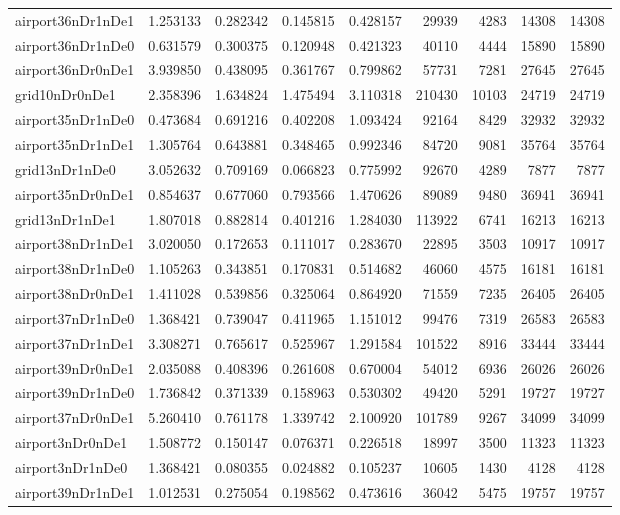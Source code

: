\begin{longtable}{|l|r|r|r|r|r|r|r|r|}
airport36nDr1nDe1 & 1.253133 & 0.282342 & 0.145815 & 0.428157 & 29939 & 4283 & 14308 & 14308 \\
airport36nDr1nDe0 & 0.631579 & 0.300375 & 0.120948 & 0.421323 & 40110 & 4444 & 15890 & 15890 \\
airport36nDr0nDe1 & 3.939850 & 0.438095 & 0.361767 & 0.799862 & 57731 & 7281 & 27645 & 27645 \\
grid10nDr0nDe1 & 2.358396 & 1.634824 & 1.475494 & 3.110318 & 210430 & 10103 & 24719 & 24719 \\
airport35nDr1nDe0 & 0.473684 & 0.691216 & 0.402208 & 1.093424 & 92164 & 8429 & 32932 & 32932 \\
airport35nDr1nDe1 & 1.305764 & 0.643881 & 0.348465 & 0.992346 & 84720 & 9081 & 35764 & 35764 \\
grid13nDr1nDe0 & 3.052632 & 0.709169 & 0.066823 & 0.775992 & 92670 & 4289 & 7877 & 7877 \\
airport35nDr0nDe1 & 0.854637 & 0.677060 & 0.793566 & 1.470626 & 89089 & 9480 & 36941 & 36941 \\
grid13nDr1nDe1 & 1.807018 & 0.882814 & 0.401216 & 1.284030 & 113922 & 6741 & 16213 & 16213 \\
airport38nDr1nDe1 & 3.020050 & 0.172653 & 0.111017 & 0.283670 & 22895 & 3503 & 10917 & 10917 \\
airport38nDr1nDe0 & 1.105263 & 0.343851 & 0.170831 & 0.514682 & 46060 & 4575 & 16181 & 16181 \\
airport38nDr0nDe1 & 1.411028 & 0.539856 & 0.325064 & 0.864920 & 71559 & 7235 & 26405 & 26405 \\
airport37nDr1nDe0 & 1.368421 & 0.739047 & 0.411965 & 1.151012 & 99476 & 7319 & 26583 & 26583 \\
airport37nDr1nDe1 & 3.308271 & 0.765617 & 0.525967 & 1.291584 & 101522 & 8916 & 33444 & 33444 \\
airport39nDr0nDe1 & 2.035088 & 0.408396 & 0.261608 & 0.670004 & 54012 & 6936 & 26026 & 26026 \\
airport39nDr1nDe0 & 1.736842 & 0.371339 & 0.158963 & 0.530302 & 49420 & 5291 & 19727 & 19727 \\
airport37nDr0nDe1 & 5.260410 & 0.761178 & 1.339742 & 2.100920 & 101789 & 9267 & 34099 & 34099 \\
airport3nDr0nDe1 & 1.508772 & 0.150147 & 0.076371 & 0.226518 & 18997 & 3500 & 11323 & 11323 \\
airport3nDr1nDe0 & 1.368421 & 0.080355 & 0.024882 & 0.105237 & 10605 & 1430 & 4128 & 4128 \\
airport39nDr1nDe1 & 1.012531 & 0.275054 & 0.198562 & 0.473616 & 36042 & 5475 & 19757 & 19757 \\

\end{longtable}
